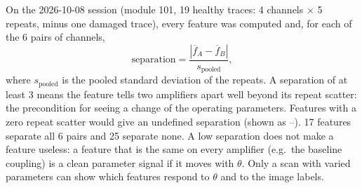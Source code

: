 \documentclass[10pt]{article}
\begin{document}
On the 2026-10-08 session (module 101, 19 healthy traces: 4 channels $\times$ 5 repeats, minus one
damaged trace), every feature was computed and, for each of the 6 pairs of channels,
\begin{equation}
\text{separation} = \frac{|\overline{f}_A-\overline{f}_B|}{s_\text{pooled}},
\end{equation}
where $s_\text{pooled}$ is the pooled standard deviation of the repeats. A separation of at least 3 means the feature tells two
amplifiers apart well beyond its repeat scatter: the precondition for seeing a change of the operating parameters. Features with a
zero repeat scatter would give an undefined separation (shown as --).
17 features separate all 6 pairs and 25 separate none.
A low separation does not make a feature useless: a feature that is the same on every amplifier (e.g.\ the baseline coupling) is
a clean parameter signal if it moves with $\theta$. Only a scan with varied parameters can show which features respond to $\theta$
and to the image labels.
\end{document}
